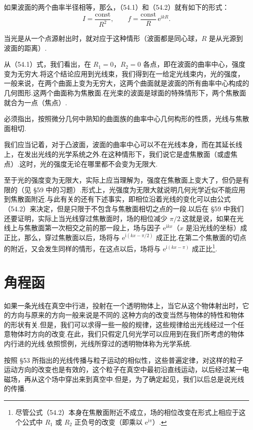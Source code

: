 如果波面的两个曲率半径相等，那么，（54.1）和（54.2）就有如下的形式：
\begin{equation}
  I=\frac{\mathrm{const}}{R^2},\qquad
  f=\frac{\mathrm{const}}{R}\,\mathrm{e}^{\mathrm{i}kR}.
\end{equation}

当光是从一个点源射出时，就对应于这种情形（波面都是同心球，$R$ 是从光源到波面的距离）.

从（54.1）式，我们看出，在 $R_1=0$，$R_2=0$ 各点，即在波面的曲率中心，强度变为无穷大.将这个结论应用到光线束，我们得到在一给定光线束内，光的强度，一般来说，在两个曲面上变为无穷大，这两个曲面就是波面的所有曲率中心构成的几何图形.这两个曲面称为焦散面.在光束的波面是球面的特殊情形下，两个焦散面就合为一点（焦点）.

必须指出，按照微分几何中熟知的曲面族的曲率中心几何构形的性质，光线与焦散面相切.

我们应当记着，对于凸波面，波面的曲率中心可以不在光线本身，而在其延长线上，在发出光线的光学系统之外.在这种情形下，我们说它是虚焦散面（或虚焦点）.这时，光的强度无论在哪里都不会变为无限大.

至于光的强度变为无限大，实际上应当理解为，强度在焦散面上变大了，但仍是有限的（见 §59 中的习题）.形式上，光强度为无限大就说明几何光学近似不能应用到焦散面附近.与此有关的还有下述事实，即相位沿着光线的变化可以由公式（54.2）来决定，但是只限于不包含与焦散面相切之点的一段.以后在 §59 中我们还要证明，实际上当光线穿过焦散面时，场的相位减少 $\pi/2$.这就是说，如果在光线上与焦散面第一次相交之前的那一段上，场与因子 $\mathrm{e}^{\mathrm{i}kx}$（$x$ 是沿光线的坐标）成正比，那么，穿过焦散面以后，场将与 $\mathrm{e}^{\mathrm{i}(kx-\pi/2)}$ 成正比.在第二个焦散面的切点的附近，又会发生同样的情形，在这点以后，场将与 $\mathrm{e}^{\mathrm{i}(kx-\pi)}$ 成正比\footnote{尽管公式（54.2）本身在焦散面附近不成立，场的相位改变在形式上相应于这个公式中 $R_1$ 或 $R_2$ 正负号的改变（即乘以 $\mathrm{e}^{\mathrm{i}\pi}$）.}.

\section{角程函}

如果一条光线在真空中行进，投射在一个透明物体上，当它从这个物体射出时，它的方向与原来的方向一般来说是不同的.这种方向的改变当然与物体的特性和物体的形状有关.但是，我们可以求得一些一般的规律，这些规律给出光线经过一个任意物体时方向的改变.在此，我们只假定几何光学可以应用到在我们所考虑的物体内行进的光线.依照惯例，光线所穿过的透明物体称为光学系统.

按照 §53 所指出的光线传播与粒子运动的相似性，这些普遍定律，对这样的粒子运动方向的改变也是有效的，这个粒子在真空中最初沿直线运动，以后经过某一电磁场，再从这个场中穿出来到真空中.但是，为了确定起见，我们以后总是说光线的传播.

